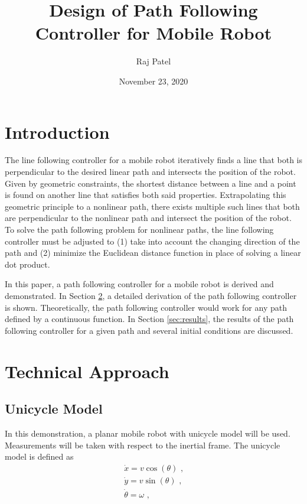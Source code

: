 \documentclass[11pt, letterpaper]{article}
\numberwithin{equation}{section}
\begin{document}
\title{Design of Path Following Controller for Mobile Robot}
\author{Raj Patel}
\date{November 23, 2020}
\maketitle
\tableofcontents
\newpage

\section{Introduction}

The line following controller for a mobile robot iteratively finds a line that both is perpendicular to the desired linear path and intersects the position of the robot. Given by geometric constraints, the shortest distance between a line and a point is found on another line that satisfies both said properties. Extrapolating this geometric principle to a nonlinear path, there exists multiple such lines that both are perpendicular to the nonlinear path and intersect the position of the robot. To solve the path following problem for nonlinear paths, the line following controller must be adjusted to (1) take into account the changing direction of the path and (2) minimize the Euclidean distance function in place of solving a linear dot product.

In this paper, a path following controller for a mobile robot is derived and demonstrated. In Section \ref{sec:tech_app}, a detailed derivation of the path following controller is shown. Theoretically, the path following controller would work for any path defined by a continuous function. In Section \ref{sec:results}, the results of the path following controller for a given path and several initial conditions are discussed.

\section{Technical Approach}
\label{sec:tech_app}

\subsection{Unicycle Model}

In this demonstration, a planar mobile robot with unicycle model will be used. Measurements will be taken with respect to the inertial frame. The unicycle model is defined as
\begin{gather}
    \dot{x} = v \cos(\theta) \text{ ,} \\
    \dot{y} = v \sin(\theta) \text{ ,} \\
    \dot{\theta} = \omega \text{ ,}
\end{gather}
\end{document}
